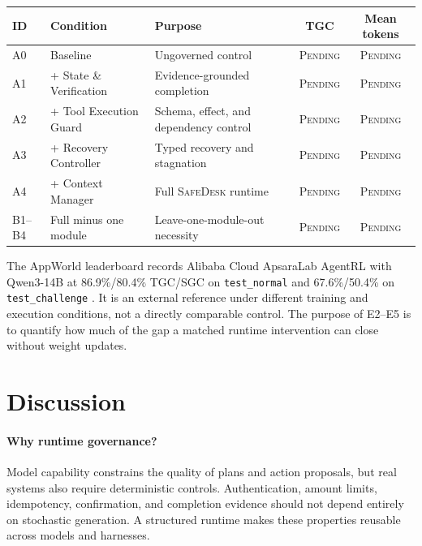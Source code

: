 \documentclass[10pt]{article}
\newcommand{\safedesk}{\textsc{SafeDesk}}
\newcommand{\pending}{\textsc{Pending}}
\begin{document}
\begin{center}
\begin{minipage}{\linewidth}
\centering
{}
\label{tab:ablations}
\small
\begin{tabularx}{\linewidth}{@{}lYYcc@{}}
\toprule
ID & Condition & Purpose & TGC & Mean tokens \\
\midrule
A0 & Baseline & Ungoverned control & \pending & \pending \\
A1 & + State \& Verification & Evidence-grounded completion & \pending & \pending \\
A2 & + Tool Execution Guard & Schema, effect, and dependency control & \pending & \pending \\
A3 & + Recovery Controller & Typed recovery and stagnation & \pending & \pending \\
A4 & + Context Manager & Full \safedesk{} runtime & \pending & \pending \\
B1--B4 & Full minus one module & Leave-one-module-out necessity & \pending & \pending \\
\bottomrule
\end{tabularx}
\end{minipage}
\end{center}

The AppWorld leaderboard records Alibaba Cloud ApsaraLab AgentRL with Qwen3-14B
at 86.9\%/80.4\% TGC/SGC on \texttt{test\_normal} and 67.6\%/50.4\% on
\texttt{test\_challenge} \citep{appworldleaderboard2026}. It is an external
reference under different training and execution conditions, not a directly
comparable control. The purpose of E2--E5 is to quantify how much of the gap a
matched runtime intervention can close without weight updates.

\section{Discussion}

\paragraph{Why runtime governance?}
Model capability constrains the quality of plans and action proposals, but real
systems also require deterministic controls. Authentication, amount limits,
idempotency, confirmation, and completion evidence should not depend entirely on
stochastic generation. A structured runtime makes these properties reusable
across models and harnesses.
\end{document}
